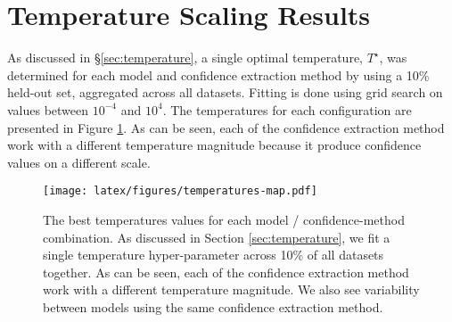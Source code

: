 \section{Temperature Scaling Results}
\label{sec:appendix-temperature}

As discussed in \S\ref{sec:temperature}, a single optimal temperature, $T^\star$, was determined for each model and confidence extraction method by using a 10\% held-out set, aggregated across all datasets. Fitting is done using grid search on values between $10^{-4}$ and $10^{4}$. The temperatures for each configuration are presented in Figure \ref{fig:temperatures-map}. As can be seen, each of the confidence extraction method work with a different temperature magnitude because it produce confidence values on a different scale.

\begin{figure}[h]
    \centering
    \texttt{[image: latex/figures/temperatures-map.pdf]}
    \caption{The best temperatures values for each model / confidence-method combination. As discussed in Section \ref{sec:temperature}, we fit a single temperature hyper-parameter across 10\% of all datasets together. As can be seen, each of the confidence extraction method work with a different temperature magnitude. We also see variability between models using the same confidence extraction method.
    }
    \label{fig:temperatures-map}
\end{figure}
